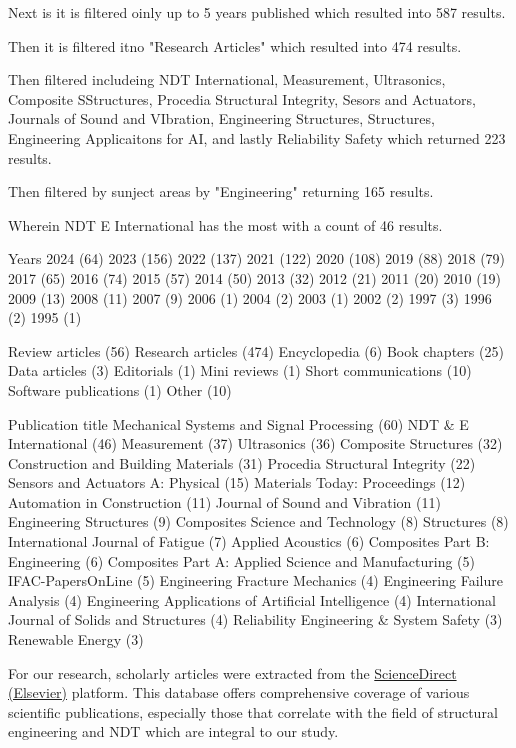 \documentclass[journal, a4paper]{IEEEtran}
\begin{document}
Next is it is filtered oinly up to 5 years published which resulted into 587 results.

Then it is filtered itno "Research Articles" which resulted into 474 results.

Then filtered includeing NDT International, Measurement, Ultrasonics, Composite SStructures, Procedia Structural Integrity, Sesors and Actuators, Journals of Sound and VIbration, Engineering Structures, Structures, Engineering Applicaitons for AI, and lastly Reliability Safety
which returned 223 results.

Then filtered by sunject areas by "Engineering" returning 165 results.

Wherein NDT E International has the most with a count of 46 results.

Years
2024 (64)
2023 (156)
2022 (137)
2021 (122)
2020 (108)
2019 (88)
2018 (79)
2017 (65)
2016 (74)
2015 (57)
2014 (50)
2013 (32)
2012 (21)
2011 (20)
2010 (19)
2009 (13)
2008 (11)
2007 (9)
2006 (1)
2004 (2)
2003 (1)
2002 (2)
1997 (3)
1996 (2)
1995 (1)


Review articles (56)
Research articles (474)
Encyclopedia (6)
Book chapters (25)
Data articles (3)
Editorials (1)
Mini reviews (1)
Short communications (10)
Software publications (1)
Other (10)

Publication title
Mechanical Systems and Signal Processing (60)
NDT \& E International (46)
Measurement (37)
Ultrasonics (36)
Composite Structures (32)
Construction and Building Materials (31)
Procedia Structural Integrity (22)
Sensors and Actuators A: Physical (15)
Materials Today: Proceedings (12)
Automation in Construction (11)
Journal of Sound and Vibration (11)
Engineering Structures (9)
Composites Science and Technology (8)
Structures (8)
International Journal of Fatigue (7)
Applied Acoustics (6)
Composites Part B: Engineering (6)
Composites Part A: Applied Science and Manufacturing (5)
IFAC-PapersOnLine (5)
Engineering Fracture Mechanics (4)
Engineering Failure Analysis (4)
Engineering Applications of Artificial Intelligence (4)
International Journal of Solids and Structures (4)
Reliability Engineering \& System Safety (3)
Renewable Energy (3)


For our research, scholarly articles were extracted from the
\href{https://www.sciencedirect.com/}{ScienceDirect (Elsevier)} platform.
This database offers comprehensive coverage of various scientific publications,
especially those that correlate with the field of structural engineering and NDT
which are integral to our study.
\end{document}
